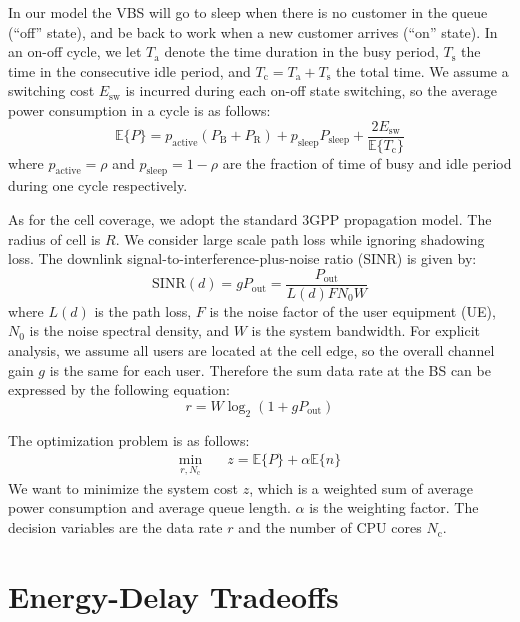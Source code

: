 \documentclass[conference]{IEEEtran}
\newcommand{\E}[1]{\mathbb{E}\{#1\}}
\begin{document}
In our model the VBS will go to sleep when there is no customer in the queue (``off''
state), and be back to work when a new customer arrives (``on'' state).
In an on-off cycle, we let $T_\text{a}$ denote the time
duration in the busy period, $T_\text{s}$ the time in the consecutive idle period,
and $T_\text{c} = T_\text{a} + T_\text{s}$ the total time.
We assume a switching cost $E_\text{sw}$ is incurred during each on-off state
switching, so the average power consumption in a cycle is as follows:
\begin{equation}
  \E{P} = p_\text{active} (P_\text{B} + P_\text{R}) + p_\text{sleep} P_
  \text{sleep} + \frac{2 E_\text{sw}}{\E{T_\text{c}}}
  \label{eqn:Ep}
\end{equation}
where $p_\text{active}=\rho$ and $p_\text{sleep}=1-\rho$ are the fraction of time of busy
and idle period during one cycle respectively.

As for the cell coverage, we adopt the standard 3GPP propagation model.
The radius of cell is $R$. We consider large scale path loss while ignoring
shadowing loss. The downlink signal-to-interference-plus-noise ratio (SINR)
is given by:
\begin{equation}
  \text{SINR}(d) = g P_{\text{out}} =
  \frac{P_{\text{out}}}{L(d) F N_0 W}
  \label{eqn:sinr-g}
\end{equation}
where $L(d)$ is the path loss, $F$ is the noise factor of the user equipment
(UE), $N_0$ is the
noise spectral density, and $W$ is the system bandwidth.
For explicit analysis, we assume all users are located at the cell
edge, so the overall channel gain $g$ is the same for each user.
Therefore the sum data rate at the BS can be expressed by the following
equation:
\begin{equation}
  r = W \log_2 (1+ g P_{\text{out}})
  \label{eqn:rate-g}
\end{equation}

The optimization problem is as follows:
\begin{align}
  \min_{r, N_\text{c}}\quad & z = \mathbb{E}\{P\} + \alpha \E{n}
\end{align}
We want to minimize the system cost $z$, which is a weighted sum of average power
consumption and average queue length. $\alpha$ is the weighting factor.
The decision variables are the data rate $r$ and the number of CPU cores
$N_\text{c}$.

\section{Energy-Delay Tradeoffs}
\label{sec:edt}
\end{document}
